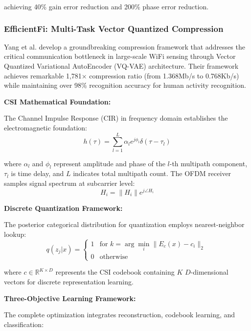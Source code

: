 \documentclass[journal]{IEEEtran}
\begin{document}
achieving 40\% gain error reduction and 200\% phase error reduction.

\subsubsection{EfficientFi: Multi-Task Vector Quantized Compression}

Yang et al. \cite{yang2022efficientfi} develop a groundbreaking compression framework that addresses the critical communication bottleneck in large-scale WiFi sensing through Vector Quantized Variational AutoEncoder (VQ-VAE) architecture. Their framework achieves remarkable 1,781× compression ratio (from 1.368Mb/s to 0.768Kb/s) while maintaining over 98\% recognition accuracy for human activity recognition.

\textbf{CSI Mathematical Foundation:}

The Channel Impulse Response (CIR) in frequency domain establishes the electromagnetic foundation:
\begin{equation}
h(\tau) = \sum_{l=1}^{L} \alpha_l e^{j\phi_l} \delta(\tau - \tau_l)
\label{eq:yang_cir}
\end{equation}

where $\alpha_l$ and $\phi_l$ represent amplitude and phase of the $l$-th multipath component, $\tau_l$ is time delay, and $L$ indicates total multipath count. The OFDM receiver samples signal spectrum at subcarrier level:
\begin{equation}
H_i = \|H_i\| e^{j\angle H_i}
\label{eq:yang_csi_complex}
\end{equation}

\textbf{Discrete Quantization Framework:}

The posterior categorical distribution for quantization employs nearest-neighbor lookup:
\begin{equation}
q(z_j|x) = \begin{cases}
1 & \text{for } k = \arg\min_i \|E_c(x) - c_i\|_2 \\
0 & \text{otherwise}
\end{cases}
\label{eq:yang_quantization}
\end{equation}

where $c \in \mathbb{R}^{K \times D}$ represents the CSI codebook containing $K$ $D$-dimensional vectors for discrete representation learning.

\textbf{Three-Objective Learning Framework:}

The complete optimization integrates reconstruction, codebook learning, and classification:
\end{document}
